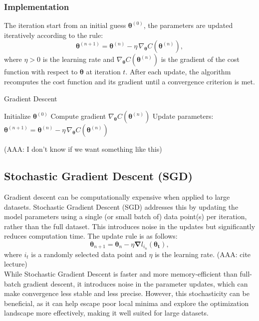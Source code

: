 \documentclass[%
 reprint,            %
 amsmath,amssymb,
 aps,
]{revtex4-2}
\begin{document}
\subsubsection{Implementation}
The iteration start from an initial guess $\boldsymbol{\theta}^{(0)}$, the parameters are updated iteratively according to the rule:
\[
\boldsymbol{\theta}^{(n+1)} = \boldsymbol{\theta}^{(n)} - \eta \, \nabla_{\boldsymbol{\theta}} C(\boldsymbol{\theta}^{(n)}),
\]
where $\eta > 0$ is the learning rate and $\nabla_{\boldsymbol{\theta}} C(\boldsymbol{\theta}^{(n)})$ is the gradient of the cost function with respect to $\boldsymbol{\theta}$ at iteration $t$.
After each update, the algorithm recomputes the cost function and its gradient until a convergence criterion is met.\\

\begin{algorithm}[H]
\caption{Gradient Descent}
\begin{algorithmic}[1]
\State Initialize $\boldsymbol{\theta}^{(0)}$
    \State Compute gradient $\nabla_{\boldsymbol{\theta}} C(\boldsymbol{\theta}^{(n)})$
    \State Update parameters: 
    $\boldsymbol{\theta}^{(n+1)} = \boldsymbol{\theta}^{(n)} - \eta \, \nabla_{\boldsymbol{\theta}} C(\boldsymbol{\theta}^{(n)})$
\EndFor
\end{algorithmic}
\end{algorithm}

(AAA: I don't know if we want something like this)

\subsection{Stochastic Gradient Descent (SGD)}
Gradient descent can be computationally expensive when applied to large datasets. Stochastic Gradient Descent (SGD) addresses this by updating the model parameters using a single (or small batch of) data point(s) per iteration, rather than the full dataset. This introduces noise in the updates but significantly reduces computation time. The update rule is as follows:  
$$
\boldsymbol{\theta}_{n+1} = \boldsymbol{\theta}_n - {\eta \boldsymbol{\nabla}} l_{i_n} (\boldsymbol{\theta_t}),
$$  
where \(i_t\) is a randomly selected data point and \(\eta\) is the learning rate. (AAA: cite lecture)\\

While Stochastic Gradient Descent is faster and more memory-efficient than full-batch gradient descent, it introduces noise in the parameter updates, which can make convergence less stable and less precise. However, this stochasticity can be beneficial, as it can help escape poor local minima and explore the optimization landscape more effectively, making it well suited for large datasets.
\end{document}
